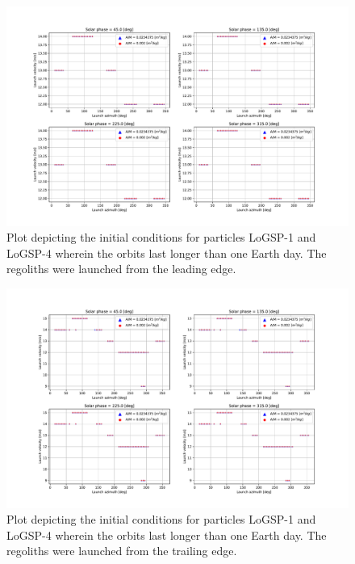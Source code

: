 \documentclass[print]{tudelft-report}
\begin{document}
\begin{appendices}
    \FloatBarrier
    \begin{figure}[htb]
    \centering
    \captionsetup{justification=centering}
    \includegraphics[width=\textwidth, height=0.6\textheight, keepaspectratio=true]{Results/Images/asteroid_mining/leadingEdge_orbitMoreThanOneDay.pdf}
    \caption{Plot depicting the initial conditions for particles LoGSP-1 and LoGSP-4 wherein the orbits last longer than one Earth day. The regoliths were launched from the leading edge.}
    \label{fig:leadingEdge_IC_for_24h_orbits}
    \end{figure}
    \FloatBarrier
    \begin{figure}[htb]
    \centering
    \captionsetup{justification=centering}
    \includegraphics[width=\textwidth, height=0.6\textheight, keepaspectratio=true]{Results/Images/asteroid_mining/trailingEdge_orbitMoreThanOneDay.pdf}
    \caption{Plot depicting the initial conditions for particles LoGSP-1 and LoGSP-4 wherein the orbits last longer than one Earth day. The regoliths were launched from the trailing edge.}

\end{figure}
\end{appendices}
\end{document}
